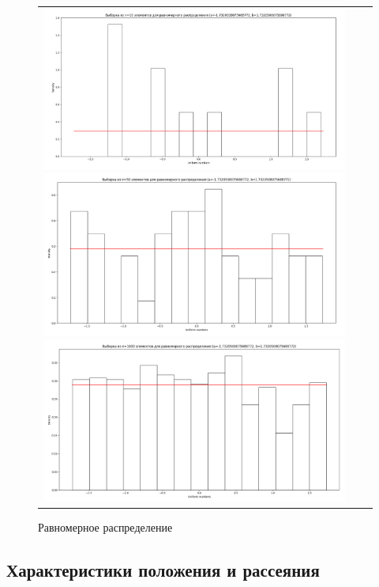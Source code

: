 \begin{figure}[H]
	\begin{tabular}{ccc}
		\includegraphics[scale=0.12]{resources/1_uniform_10.png}
		\includegraphics[scale=0.12]{resources/1_uniform_50.png}
		\includegraphics[scale=0.12]{resources/1_uniform_1000.png}
	\end{tabular}
	\caption{Равномерное распределение}
\end{figure}

\subsection{Характеристики положения и рассеяния}

